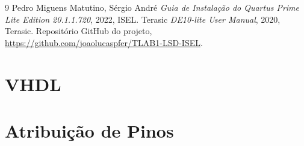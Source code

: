\documentclass[12pt]{article}
\begin{document}
\clearpage
\begin{thebibliography}{9}
Pedro Miguens Matutino, Sérgio André \emph{Guia de Instalação do Quartus Prime Lite Edition 20.1.1.720}, 2022, ISEL.
Terasic \emph{DE10-lite User Manual}, 2020, Terasic.
Repositório GitHub do projeto, \url{https://github.com/joaolucaspfer/TLAB1-LSD-ISEL}.
\end{thebibliography}


\clearpage
\appendix
\section{VHDL}













\clearpage
\section{Atribuição de Pinos}
\label{apx:pinos}
\end{document}
